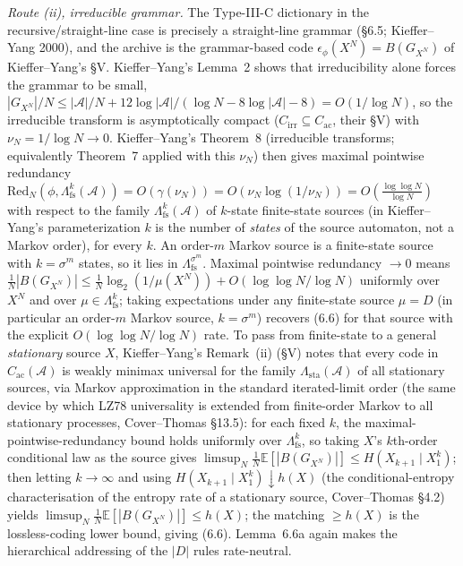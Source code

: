 \documentclass[
]{article}
\begin{document}
\emph{Route (ii), irreducible grammar.} The Type-III-C dictionary in
the recursive/straight-line case is precisely a straight-line grammar
(§6.5; Kieffer--Yang 2000), and the archive is the grammar-based code
$\epsilon_\phi(X^N) = B(G_{X^N})$ of Kieffer--Yang's \S V. Kieffer--Yang's
Lemma~2 shows that irreducibility alone forces the grammar to be small,
$|G_{X^N}|/N \le |\mathcal{A}|/N + 12\log|\mathcal{A}|/(\log N - 8\log
|\mathcal{A}| - 8) = O(1/\log N)$, so the irreducible transform is
asymptotically compact ($C_{\mathrm{irr}} \subseteq C_{\mathrm{ac}}$,
their \S V) with $\nu_N = 1/\log N \to 0$. Kieffer--Yang's Theorem~8
(irreducible transforms; equivalently Theorem~7 applied with this
$\nu_N$) then gives maximal pointwise redundancy
$\mathrm{Red}_N(\phi, \Lambda^k_{\mathrm{fs}}(\mathcal{A})) =
O(\gamma(\nu_N)) = O\!\left(\nu_N \log(1/\nu_N)\right) = O\!\left(\frac{\log\log
N}{\log N}\right)$
with respect to the family $\Lambda^k_{\mathrm{fs}}(\mathcal{A})$ of
$k$-state finite-state sources (in Kieffer--Yang's parameterization $k$
is the number of \emph{states} of the source automaton, not a Markov
order), for every $k$. An order-$m$ Markov source is a finite-state
source with $k = \sigma^m$ states, so it lies in
$\Lambda^{\sigma^m}_{\mathrm{fs}}$. Maximal pointwise
redundancy $\to 0$ means $\tfrac{1}{N}|B(G_{X^N})| \le \tfrac{1}{N}
\log_2 (1/\mu(X^N)) + O(\log\log N/\log N)$ uniformly over $X^N$ and
over $\mu \in \Lambda^k_{\mathrm{fs}}$; taking expectations under any
finite-state source $\mu = D$ (in particular an order-$m$ Markov source,
$k = \sigma^m$) recovers (6.6) for that source with the explicit
$O(\log\log N/\log N)$ rate. To pass from finite-state to a general
\emph{stationary} source $X$, Kieffer--Yang's Remark~(ii) (\S V) notes
that every code in $C_{\mathrm{ac}}(\mathcal{A})$ is weakly minimax
universal for the family $\Lambda_{\mathrm{sta}}(\mathcal{A})$ of all
stationary sources, via Markov approximation in the standard
iterated-limit order (the same device by which LZ78 universality is
extended from finite-order Markov to all stationary processes,
Cover--Thomas \S13.5): for each fixed $k$, the
maximal-pointwise-redundancy bound holds uniformly over
$\Lambda^k_{\mathrm{fs}}$, so taking $X$'s $k$th-order conditional law as
the source gives $\limsup_N \tfrac{1}{N}\mathbb{E}[|B(G_{X^N})|] \le
H(X_{k+1}\mid X_1^k)$; then letting $k \to \infty$ and using
$H(X_{k+1}\mid X_1^k) \downarrow h(X)$ (the conditional-entropy
characterisation of the entropy rate of a stationary source,
Cover--Thomas \S4.2) yields
$\limsup_N \tfrac{1}{N}\mathbb{E}[|B(G_{X^N})|] \le h(X)$; the matching
$\ge h(X)$ is the lossless-coding lower bound, giving (6.6). Lemma~6.6a
again makes the hierarchical addressing of the $|D|$ rules
rate-neutral.
\end{document}
